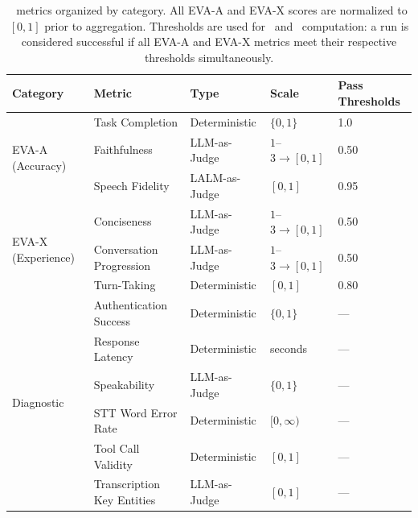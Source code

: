 \begin{table}[h]
\centering
\small
\captionsetup{font=small}
\caption{\framework~metrics organized by category. All EVA-A and EVA-X 
scores are normalized to $[0,1]$ prior to aggregation. Thresholds are 
used for \passatk~and \passpowerk~computation: a run is considered 
successful if all EVA-A and EVA-X metrics meet their respective 
thresholds simultaneously.}
\begin{tabular}{lllll}
\toprule
\textbf{Category} & \textbf{Metric} & \textbf{Type} & 
\textbf{Scale} & \textbf{Pass Thresholds} \\
\midrule
\multirow{3}{*}{EVA-A (Accuracy)}
  & Task Completion       & Deterministic   & $\{0, 1\}$          & 1.0 \\
  & Faithfulness          & LLM-as-Judge    & $1$--$3 \to [0,1]$  & 0.50 \\
  & Speech Fidelity & LALM-as-Judge   & $[0, 1]$            & 0.95 \\
\midrule
\multirow{3}{*}{EVA-X (Experience)}
  & Conciseness           & LLM-as-Judge    & $1$--$3 \to [0,1]$  & 0.50 \\
  & Conversation Progression    & LLM-as-Judge    & $1$--$3 \to [0,1]$  & 0.50 \\
  & Turn-Taking           & Deterministic   & $[0,1]$  & 0.80 \\
\midrule
\multirow{6}{*}{Diagnostic} 
  & Authentication Success    & Deterministic   & $\{0,1\}$          & --- \\
  & Response Latency          & Deterministic   & seconds            & --- \\
  & Speakability              & LLM-as-Judge    & $\{0,1\}$          & --- \\
  & STT Word Error Rate       & Deterministic   & $[0, \infty)$      & --- \\
  & Tool Call Validity        & Deterministic   & $[0,1]$            & --- \\
  & Transcription Key Entities & LLM-as-Judge    & $[0,1]$            & --- \\
\bottomrule
\end{tabular}
\label{tab:metrics}
\end{table}